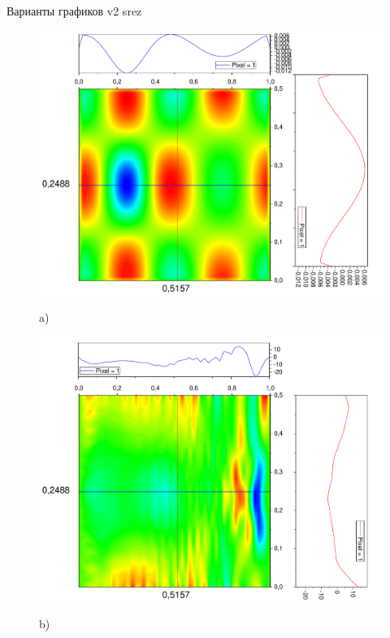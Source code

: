\documentclass[a4paper,12pt]{article}
\begin{document}
Варианты графиков v2 srez
\begin{figure}[h!]
	\begin{center}
		\begin{minipage}[h]{0.24\linewidth}
			\includegraphics[width=\textwidth]{graphs/graphs_a/v2/wave_t-0_v2_srez} \begin{center}	a)	\end{center}
		\end{minipage}
		\begin{minipage}[h]{0.24\linewidth}
			\includegraphics[width=\textwidth]{graphs/graphs_a/v2/wave_t-6_v2_srez} \begin{center}	b)	\end{center}

\end{minipage}
\end{center}
\end{figure}
\end{document}
